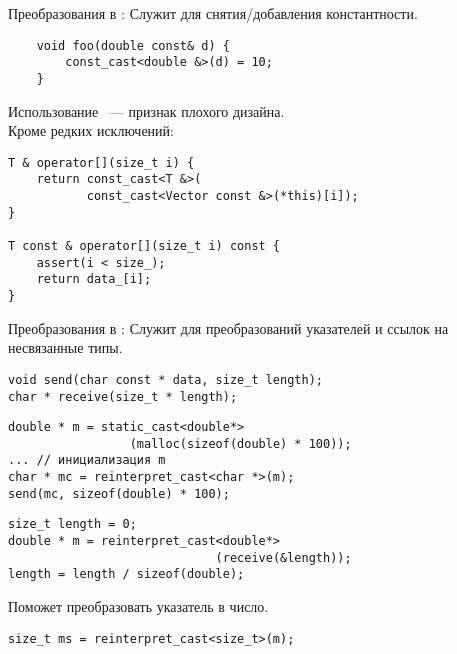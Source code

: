 \documentclass[aspectration=1610,t]{beamer}
\begin{document}
\begin{frame}[fragile]{Преобразования в \langcpp: }
    Служит для снятия/добавления константности.\pause
\begin{lstlisting}
    void foo(double const& d) {
        const_cast<double &>(d) = 10;
    } 
\end{lstlisting}
Использование ~--- признак плохого дизайна.\\
\medskip\pause
Кроме редких исключений:
\begin{lstlisting}
T & operator[](size_t i) {
    return const_cast<T &>(
           const_cast<Vector const &>(*this)[i]);
}

T const & operator[](size_t i) const {
    assert(i < size_);
    return data_[i];
}
\end{lstlisting}
\end{frame}

\begin{frame}[fragile]{Преобразования в \langcpp: }{}
    Служит для преобразований указателей и ссылок на несвязанные типы.\pause
    
\begin{lstlisting}
void send(char const * data, size_t length);
char * receive(size_t * length);
\end{lstlisting}\pause
\begin{lstlisting}
double * m = static_cast<double*>
                 (malloc(sizeof(double) * 100)); 
... // инициализация m
char * mc = reinterpret_cast<char *>(m);
send(mc, sizeof(double) * 100);
\end{lstlisting}\pause
\begin{lstlisting}
size_t length = 0;
double * m = reinterpret_cast<double*>
                             (receive(&length));
length = length / sizeof(double);
\end{lstlisting}\pause

Поможет преобразовать указатель в число.
\begin{lstlisting}
size_t ms = reinterpret_cast<size_t>(m);
\end{lstlisting}
\end{frame}
\end{document}
